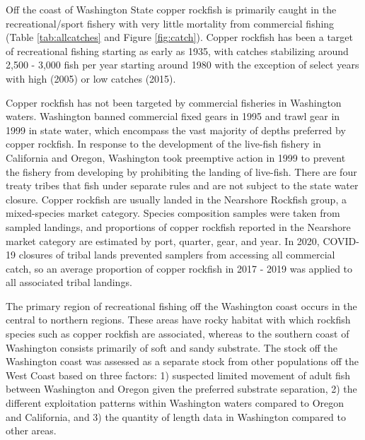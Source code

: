 \documentclass[11pt,
  english,
  a4paper,
]{article}
\begin{document}
\leavevmode\tagmcend\tagstructend


Off the coast of Washington State copper rockfish is primarily caught in the recreational/sport fishery with very little mortality from commercial fishing (Table \ref{tab:allcatches} and Figure \ref{fig:catch}). Copper rockfish has been a target of recreational fishing starting as early as 1935, with catches stabilizing around 2,500 - 3,000 fish per year starting around 1980 with the exception of select years with high (2005) or low catches (2015).

\leavevmode\tagmcend\tagstructend\par


Copper rockfish has not been targeted by commercial fisheries in Washington waters. Washington banned commercial fixed gears in 1995 and trawl gear in 1999 in state water, which encompass the vast majority of depths preferred by copper rockfish. In response to the development of the live-fish fishery in California and Oregon, Washington took preemptive action in 1999 to prevent the fishery from developing by prohibiting the landing of live-fish. There are four treaty tribes that fish under separate rules and are not subject to the state water closure. Copper rockfish are usually landed in the Nearshore Rockfish group, a mixed-species market category. Species composition samples were taken from sampled landings, and proportions of copper rockfish reported in the Nearshore market category are estimated by port, quarter, gear, and year. In 2020, COVID-19 closures of tribal lands prevented samplers from accessing all commercial catch, so an average proportion of copper rockfish in 2017 - 2019 was applied to all associated tribal landings.

\leavevmode\tagmcend\tagstructend\par


The primary region of recreational fishing off the Washington coast occurs in the central to northern regions. These areas have rocky habitat with which rockfish species such as copper rockfish are associated, whereas to the southern coast of Washington consists primarily of soft and sandy substrate. The stock off the Washington coast was assessed as a separate stock from other populations off the West Coast based on three factors: 1) suspected limited movement of adult fish between Washington and Oregon given the preferred substrate separation, 2) the different exploitation patterns within Washington waters compared to Oregon and California, and 3) the quantity of length data in Washington compared to other areas.
\end{document}
